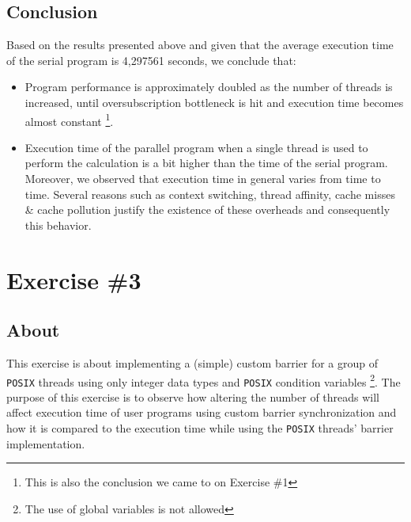 \documentclass{article}
\begin{document}
\pagebreak

\subsection{Conclusion}
Based on the results presented above and given that the average execution time of the serial
program is 4,297561 seconds, we conclude that:

\begin{itemize}
 \item Program performance is approximately doubled as the number of threads is increased, until
       oversubscription bottleneck is hit and execution time becomes almost constant
       \footnote{This is also the conclusion we came to on Exercise \#1}.
 \item Execution time of the parallel program when a single thread is used to perform the
       calculation is a bit higher than the time of the serial program. Moreover, we observed
       that execution time in general varies from time to time. Several reasons such as context
       switching, thread affinity, cache misses \& cache pollution justify the existence of
       these overheads and consequently this behavior.
\end{itemize}


\section{Exercise \#3}

\subsection{About}
This exercise is about implementing a (simple) custom barrier for a group of \texttt{POSIX}
threads using only integer data types and \texttt{POSIX} condition variables \footnote{The 
use of global variables is not allowed}. The purpose of this exercise is to observe how
altering the number of threads will affect execution time of user programs using custom
barrier synchronization and how it is compared to the execution time while using the
\texttt{POSIX} threads' barrier implementation.
\end{document}

